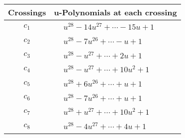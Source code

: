 \documentclass[1p]{elsarticle_modified}
\theoremstyle{definition}
\begin{document}
\begin{tabular}{m{50pt}|m{274pt}}
Crossings & \hspace{64pt}u-Polynomials at each crossing \\
\hline $$\begin{aligned}c_{1}\end{aligned}$$&$\begin{aligned}
&u^{28}-14 u^{27}+\cdots-15 u+1
\end{aligned}$\\
\hline $$\begin{aligned}c_{2}\end{aligned}$$&$\begin{aligned}
&u^{28}-7 u^{26}+\cdots- u+1
\end{aligned}$\\
\hline $$\begin{aligned}c_{3}\end{aligned}$$&$\begin{aligned}
&u^{28}- u^{27}+\cdots+2 u+1
\end{aligned}$\\
\hline $$\begin{aligned}c_{4}\end{aligned}$$&$\begin{aligned}
&u^{28}- u^{27}+\cdots+10 u^2+1
\end{aligned}$\\
\hline $$\begin{aligned}c_{5}\end{aligned}$$&$\begin{aligned}
&u^{28}+6 u^{26}+\cdots+u+1
\end{aligned}$\\
\hline $$\begin{aligned}c_{6}\end{aligned}$$&$\begin{aligned}
&u^{28}-7 u^{26}+\cdots+u+1
\end{aligned}$\\
\hline $$\begin{aligned}c_{7}\end{aligned}$$&$\begin{aligned}
&u^{28}+u^{27}+\cdots+10 u^2+1
\end{aligned}$\\
\hline $$\begin{aligned}c_{8}\end{aligned}$$&$\begin{aligned}
&u^{28}-4 u^{27}+\cdots+4 u+1
\end{aligned}$\\

\end{tabular}
\end{document}
